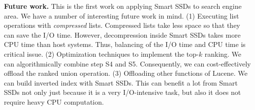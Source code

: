 \textbf{Future work.}
This is the first work on applying Smart SSDs to search engine area. We have a number of interesting future work in mind.
(1) Executing list operations with \emph{compressed} lists. Compressed lists take less space so that they can save the I/O time. However, decompression inside Smart SSDs takes more CPU time than host systems. Thus, balancing of the I/O time and CPU time is critical issue. (2) Optimization techniques to implement the top-$k$ ranking. We can algorithmically combine step S4 and S5. Consequently, we can cost-effectively offload the ranked union operation. (3) Offloading other functions of Lucene. We can build inverted index with Smart SSDs. This can benefit a lot from Smart SSDs not only just because it is a very I/O-intensive task, but also it does not require heavy CPU computation.


%
%
